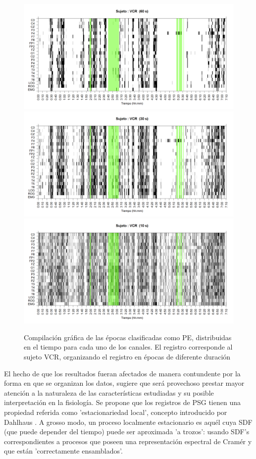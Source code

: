\documentclass[12pt,a4paper]{mitthesis}
\begin{document}
\begin{figure}
\centering
\includegraphics[width=0.9\linewidth] 
{./img_ejemplos/VCNNS1_est_60.png} 
\\
\includegraphics[width=0.9\linewidth]
{./img_ejemplos/VCNNS1_est_30.png} 
\\
\includegraphics[width=0.9\linewidth]
{./img_ejemplos/VCNNS1_est_10.png} 
\caption{Compilaci\'on gr\'afica de las \'epocas clasificadas como PE, distribuidas en el tiempo
para cada uno de los canales. El registro corresponde al sujeto VCR, organizando el registro en
\'epocas de diferente duraci\'on}
\label{comp_VCR}
\end{figure}

El hecho de que los resultados fueran afectados de manera contundente por la forma en que se 
organizan los datos, sugiere que ser\'a provechoso prestar mayor atenci\'on a la naturaleza de las 
caracter\'isticas estudiadas y su posible interpretaci\'on en la fisiolog\'ia.
Se propone que los registros de PSG tienen una propiedad referida como 'estacionariedad local',
concepto introducido por Dahlhaus \cite{Dahlhaus97}.
A grosso modo, un proceso localmente estacionario es aqu\'el cuya SDF (que puede depender del 
tiempo) puede ser aproximada 'a trozos': usando SDF's correspondientes a procesos que poseen una 
representaci\'on espectral de Cram\'er y que est\'an 'correctamente ensamblados'.
\end{document}
